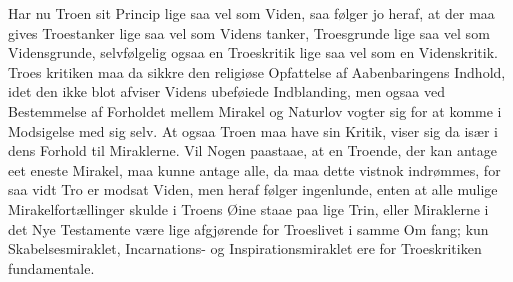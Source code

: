 \documentclass[12pt,a4paper]{article}
\newcommand{\opage}[1]{\marginnote{\footnotesize\textit{[#1]}}}
\begin{document}
Har nu Troen sit Princip lige saa vel som Viden, saa følger
jo heraf, at der maa gives Troestanker lige saa vel som Videns\-%
tanker, Troesgrunde lige saa vel som Vidensgrunde, selvfølgelig
ogsaa en Troeskritik lige saa vel som en Videnskritik. Troes\-%
kritiken maa da sikkre den religiøse Opfattelse af Aabenbaringens
Indhold, idet den ikke blot afviser Videns ubeføiede Indblanding,
men ogsaa ved Bestemmelse af Forholdet mellem Mirakel og
Naturlov vogter sig for at komme i Modsigelse med sig selv.
At ogsaa Troen maa have sin Kritik, viser sig da især i dens
Forhold til Miraklerne. Vil Nogen paastaae, at en Troende, der
kan antage eet eneste Mirakel, maa kunne antage alle, da maa
dette vistnok indrømmes, for saa vidt Tro er modsat Viden, men
heraf følger ingenlunde, enten at alle mulige Mirakelfortællinger
skulde i Troens Øine staae paa lige Trin, eller Miraklerne i det
\opage{46}Nye Testamente være lige afgjørende for Troeslivet i samme Om\-%
fang; kun Skabelsesmiraklet, Incarnations- og Inspirationsmiraklet
ere for Troeskritiken fundamentale.
\end{document}
